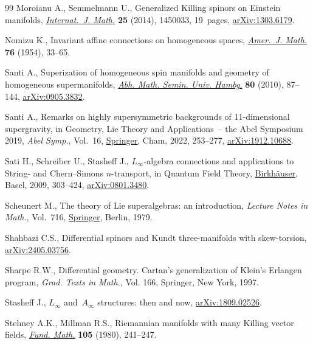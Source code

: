 \documentclass[pdftex]{sigma}
\numberwithin{equation}{section}
\newcommand{\1}{\mathbbm{1}}
\begin{document}
\begin{thebibliography}{99}
Moroianu A., Semmelmann U., Generalized {K}illing spinors on {E}instein
 manifolds,
 \href{https://doi.org/10.1142/S0129167X14500335}{\textit{Internat.~J. Math.}}
 \textbf{25} (2014), 1450033, 19~pages,
 \href{http://arxiv.org/abs/1303.6179}{arXiv:1303.6179}.

Nomizu K., Invariant affine connections on homogeneous spaces,
 \href{https://doi.org/10.2307/2372398}{\textit{Amer.~J. Math.}} \textbf{76}
 (1954), 33--65.

Santi A., Superization of homogeneous spin manifolds and geometry of
 homogeneous supermanifolds,
 \href{https://doi.org/10.1007/s12188-009-0031-2}{\textit{Abh. Math. Semin.
 Univ. Hambg.}} \textbf{80} (2010), 87--144,
 \href{http://arxiv.org/abs/0905.3832}{arXiv:0905.3832}.

Santi A., Remarks on highly supersymmetric backgrounds of 11-dimensional
 supergravity, in Geometry, {L}ie {T}heory and {A}pplications~-- the {A}bel
 {S}ymposium 2019, \textit{Abel Symp.}, Vol.~16,
 \href{https://doi.org/10.1007/978-3-030-81296-6_12}{Springer}, Cham, 2022,
 253--277, \href{http://arxiv.org/abs/1912.10688}{arXiv:1912.10688}.

Sati H., Schreiber U., Stasheff J., {$L_\infty$}-algebra connections and
 applications to {S}tring- and {C}hern--{S}imons {$n$}-transport, in Quantum
 {F}ield {T}heory,
 \href{https://doi.org/10.1007/978-3-7643-8736-5_17}{Birkh\"auser}, Basel,
 2009, 303--424, \href{http://arxiv.org/abs/0801.3480}{arXiv:0801.3480}.

Scheunert M., The theory of {L}ie superalgebras: an introduction,
 \textit{Lecture Notes in Math.}, Vol.~716,
 \href{https://doi.org/10.1007/BFb0070929}{Springer}, Berlin, 1979.

Shahbazi C.S., Differential spinors and {K}undt three-manifolds with
 skew-torsion, \href{http://arxiv.org/abs/2405.03756}{arXiv:2405.03756}.

Sharpe R.W., Differential geometry. Cartan's generalization of {K}lein's
 {E}rlangen program, \textit{Grad. Texts in Math.}, Vol. 166, Springer, New
 York, 1997.

Stasheff J., $L_\infty$ and~$A_\infty$ structures: then and now,
 \href{http://arxiv.org/abs/1809.02526}{arXiv:1809.02526}.

Stehney A.K., Millman R.S., Riemannian manifolds with many {K}illing vector
 fields, \href{https://doi.org/10.4064/fm-105-3-241-247}{\textit{Fund. Math.}}
 \textbf{105} (1980), 241--247.


\end{thebibliography}
\end{document}
